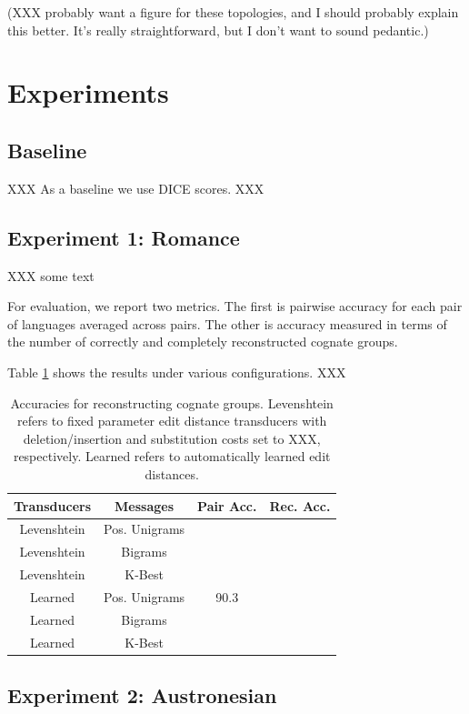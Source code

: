 \documentclass[11pt,a4paper]{article}
\begin{document}
(XXX probably want a figure for these topologies, and I should probably
explain this better. It's really straightforward, but I don't want to sound pedantic.)

\section{Experiments}

\subsection{Baseline}

XXX As a baseline we use DICE scores. XXX

\subsection{Experiment 1: Romance}

XXX some text

For evaluation, we report two metrics. The first is pairwise accuracy
for each pair of languages averaged across pairs. The other is
accuracy measured in terms of the number of correctly and completely
reconstructed cognate groups.

Table \ref{tbl:exp1} shows the results under various configurations. XXX

\begin{table}
  \begin{tabular}{|c|c|c|c|}
    Transducers & Messages & Pair Acc. & Rec. Acc.\\
    \hline
    \hline
    Levenshtein&Pos. Unigrams & & \\
    Levenshtein&Bigrams & & \\
    Levenshtein&K-Best & & \\
    \hline
    Learned&Pos. Unigrams & 90.3  & \\
    Learned&Bigrams & & \\
    Learned&K-Best & & \\
  \end{tabular}
  \caption{Accuracies for reconstructing cognate groups. Levenshtein
  refers to fixed parameter edit distance transducers with
  deletion/insertion and substitution costs set to XXX, respectively.
  Learned refers to automatically learned edit distances.}
  \label{tbl:exp1}
\end{table}

\subsection{Experiment 2: Austronesian}
\end{document}
